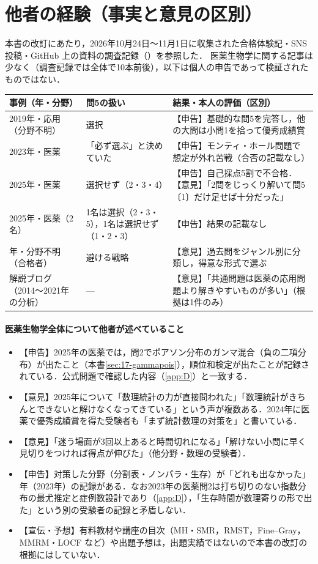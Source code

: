 \section{他者の経験（事実と意見の区別）}\label{sec:G-cases}
本書の改訂にあたり，2026年10月24日〜11月1日に収集された合格体験記・SNS 投稿・GitHub 上の資料の調査記録（\cite{web:others}）を参照した．
医薬生物学に関する記事は少なく（調査記録では全体で10本前後），以下は個人の申告であって検証されたものではない．
\begin{center}\small
\begin{tabular}{@{}L{32mm}L{40mm}L{66mm}@{}}
\toprule
事例（年・分野） & 問5の扱い & 結果・本人の評価（区別）\\
\midrule
2019年・応用（分野不明） & 選択 & 【申告】基礎的な問5を完答し，他の大問は小問1を拾って優秀成績賞\\
2023年・医薬 & 「必ず選ぶ」と決めていた & 【申告】モンティ・ホール問題で想定が外れ苦戦（合否の記載なし）\\
2025年・医薬 & 選択せず（2・3・4） & 【申告】自己採点5割で不合格．【意見】「2問をじっくり解いて問5〔1〕だけ足せば十分だった」\\
2025年・医薬（2名） & 1名は選択（2・3・5），1名は選択せず（1・2・3） & 【申告】結果の記載なし\\
年・分野不明（合格者） & 避ける戦略 & 【意見】過去問をジャンル別に分類し，得意な形式で選ぶ\\
解説ブログ（2014〜2021年の分析） & --- & 【意見】「共通問題は医薬の応用問題より解きやすいものが多い」（根拠は1件のみ）\\
\bottomrule
\end{tabular}
\end{center}
\paragraph{医薬生物学全体について他者が述べていること}
\begin{itemize}
\item 【申告】2025年の医薬では，問2でポアソン分布のガンマ混合（負の二項分布）が出たこと（本書\cref{sec:17-gammapois}），順位和検定が出たことが記録されている．公式問題で確認した内容（\cref{app:D}）と一致する．
\item 【意見】2025年について「数理統計の力が直接問われた」「数理統計がきちんとできないと解けなくなってきている」という声が複数ある．2024年に医薬で優秀成績賞を得た受験者も「まず統計数理の対策を」と書いている．
\item 【意見】「迷う場面が3回以上あると時間切れになる」「解けない小問に早く見切りをつければ得点が伸びた」（他分野・数理の受験者）．
\item 【申告】対策した分野（分割表・ノンパラ・生存）が「どれも出なかった」年（2023年）の記録がある．なお2023年の医薬問2は打ち切りのない指数分布の最尤推定と症例数設計であり（\cref{app:D}），「生存時間が数理寄りの形で出た」という別の受験者の記録と矛盾しない．
\item 【宣伝・予想】有料教材や講座の目次（MH・SMR，RMST，Fine--Gray，MMRM・LOCF など）や出題予想は，出題実績ではないので本書の改訂の根拠にはしていない．
\end{itemize}

